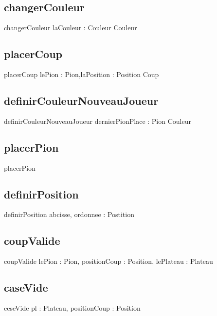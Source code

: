 	\subsection{changerCouleur}
		\begin{algorithme}
			\signaturefonction
				{changerCouleur}
				{laCouleur : Couleur}
				{Couleur}
		\end{algorithme}

	\subsection{placerCoup}
		\begin{algorithme}
			\signaturefonction
				{placerCoup}
				{lePion : Pion,laPosition : Position}
				{Coup}
		\end{algorithme}
	\subsection{definirCouleurNouveauJoueur}
		\begin{algorithme}
			\signaturefonction
				{definirCouleurNouveauJoueur}
				{dernierPionPlace : Pion}
				{Couleur}
		\end{algorithme}
	\subsection{placerPion}
		\begin{algorithme}
			\signatureprocedure
				{placerPion}
				{		\paramSortie{lePion : Pion}}
		\end{algorithme}
	\subsection{definirPosition}
		\begin{algorithme}
			\signaturefonction
				{definirPosition}
				{abcisse, ordonnee : \caractere}
				{Postition}
		\end{algorithme}
	\subsection{coupValide}
		\begin{algorithme}
			\signaturefonction
				{coupValide}
				{lePion : Pion, positionCoup : Position, lePlateau : Plateau}
				{\booleen}
		\end{algorithme}
	\subsection{caseVide}
		\begin{algorithme}
			\signaturefonction
				{ceseVide}
				{pl : Plateau, positionCoup : Position}
				{\booleen}
		\end{algorithme}
